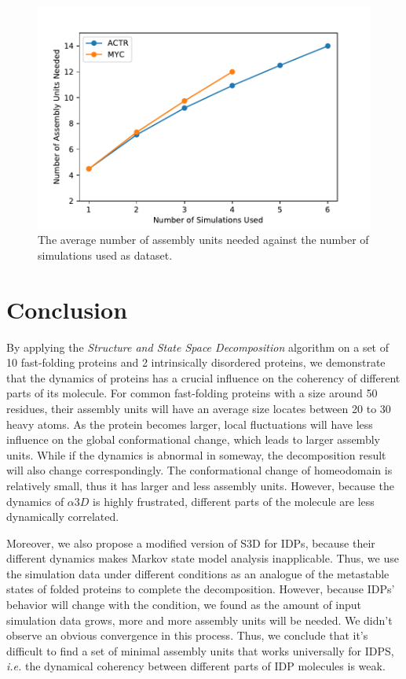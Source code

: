 \documentclass[journal=jacsat,manuscript=article]{achemso}
\begin{document}
\begin{figure}[htbp]
  \centering
  \includegraphics[width=1\textwidth]{IDP_N_units.pdf}
  \caption{\label{IDP_N_units}The average number of assembly units needed against the number of simulations used as dataset.}
\end{figure}

\section{Conclusion}

By applying the {\it Structure and State Space Decomposition} algorithm\cite{Lrenzo_S3D} on a set of 10 fast-folding proteins and 2 intrinsically disordered proteins, we demonstrate that the dynamics of proteins has a crucial influence on the coherency of different parts of its molecule. For common fast-folding proteins with a size around 50 residues, their assembly units will have an average size locates between 20 to 30 heavy atoms. As the protein becomes larger, local fluctuations will have less influence on the global conformational change, which leads to larger assembly units. While if the dynamics is abnormal in someway, the decomposition result will also change correspondingly. The conformational change of homeodomain is relatively small, thus it has larger and less assembly units. However, because the dynamics of $\alpha 3D$ is highly frustrated, different parts of the molecule are less dynamically correlated.

Moreover, we also propose a modified version of S3D for IDPs, because their different dynamics makes Markov state model analysis inapplicable. Thus, we use the simulation data under different conditions as an analogue of the metastable states of folded proteins to complete the decomposition. However, because IDPs' behavior will change with the condition, we found as the amount of input simulation data grows, more and more assembly units will be needed. We didn't observe an obvious convergence in this process. Thus, we conclude that it's difficult to find a set of minimal assembly units that works universally for IDPS, {\it i.e.} the dynamical coherency between different parts of IDP molecules is weak.
\end{document}
